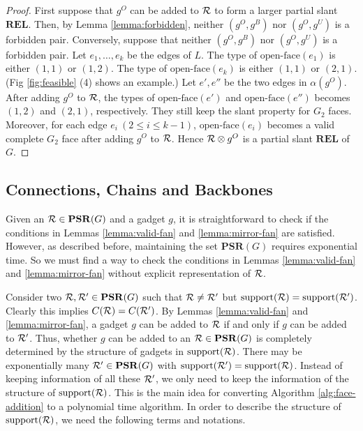 \documentclass[11pt]{article}
\newcommand{\R}{{\cal R}}
\newcommand{\REL}{\mathbf{REL}}
\newcommand{\PSR}{\mathbf{PSR}}
\begin{document}
\begin{proof}
First suppose that $g^O$ can be added to $\R$ to form a larger partial slant $\REL$.
Then, by Lemma \ref{lemma:forbidden}, neither $(g^O, g^B)$ nor $(g^O, g^U)$
is a forbidden pair.
Conversely, suppose that neither $(g^O, g^B)$ nor $(g^O, g^U)$
is a forbidden pair. Let $e_1,\ldots, e_k$ be the edges of $L$.
The type of $\mbox{open-face}(e_1)$ is either $(1, 1)$ or $(1, 2)$.
The type of $\mbox{open-face}(e_k)$ is either $(1, 1)$ or $(2, 1)$.
(Fig \ref{fig:feasible} (4) shows an example.)
Let $e', e''$ be the two edges in $\alpha(g^O)$.
After adding $g^O$ to $\R$, the types of $\mbox{open-face}(e')$ and
$\mbox{open-face}(e'')$ becomes $(1, 2)$ and $(2, 1)$, respectively.
They still keep the slant property for $G_2$ faces. Moreover, for each
edge $e_i~(2\leq i\leq k-1)$, $\mbox{open-face}(e_i)$ becomes
a valid complete $G_2$ face after adding $g^O$ to $\R$. Hence
$\R \otimes g^O$  is a partial slant $\REL$ of $G$.
\end{proof}

\subsection{Connections, Chains and Backbones}
\label{subsec:chains}

Given an $\R \in \PSR(G)$ and a gadget $g$, it is straightforward to check
if the conditions in Lemmas \ref{lemma:valid-fan} and \ref{lemma:mirror-fan}
are satisfied. However, as described before, maintaining the set $\PSR(G)$
requires exponential time. So we must find a way to check the conditions in
Lemmas \ref{lemma:valid-fan} and \ref{lemma:mirror-fan} without explicit
representation of $\R$.

Consider two $\R,\R'\in\PSR(G)$ such that $\R \neq \R'$ but
$\mbox{support}(\R) =\mbox{support}(\R')$.
Clearly this implies $C(\R) = C(\R')$.
By Lemmas \ref{lemma:valid-fan} and \ref{lemma:mirror-fan},
a gadget $g$ can be added to $\R$ if and only if $g$ can be added to $\R'$.
Thus, whether $g$ can be added to an $\R\in \PSR(G)$ is completely determined
by the structure of gadgets in $\mbox{support}(\R)$. There may be exponentially
many $\R' \in \PSR(G)$ with $\mbox{support}(\R') =\mbox{support}(\R)$. Instead of
keeping information of all these $\R'$, we only need to keep the information
of the structure of $\mbox{support}(\R)$. This is the main idea for converting
Algorithm \ref{alg:face-addition} to a polynomial time algorithm.
In order to describe the structure of $\mbox{support}(\R)$,
we need the following terms and notations.
\end{document}
